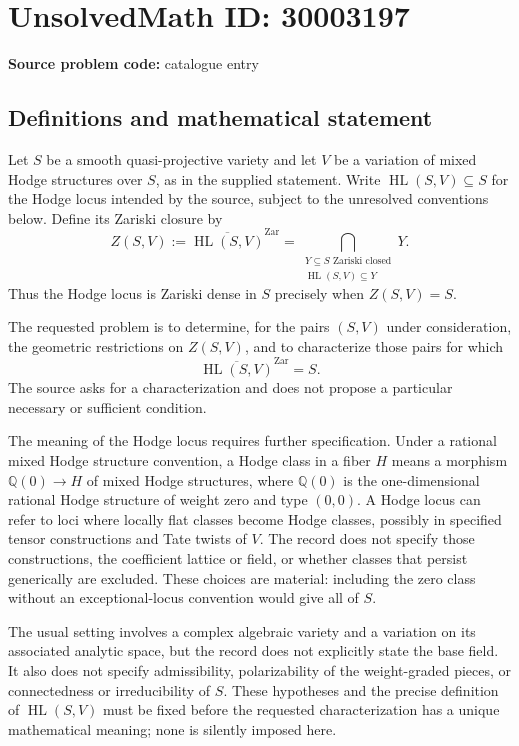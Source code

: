 \documentclass[11pt]{article}
\newcommand{\Q}{\mathbb{Q}}
\begin{document}
\section*{UnsolvedMath ID: 30003197}
\textbf{Source problem code:} catalogue entry
\subsection{Definitions and mathematical statement}
Let \(S\) be a smooth quasi-projective variety and let \(V\) be a variation of mixed Hodge structures over \(S\), as in the supplied statement. Write \(\operatorname{HL}(S,V)\subseteq S\) for the Hodge locus intended by the source, subject to the unresolved conventions below. Define its Zariski closure by
\[
Z(S,V):=\overline{\operatorname{HL}(S,V)}^{\mathrm{Zar}}
=\bigcap_{\substack{Y\subseteq S\text{ Zariski closed}\\ \operatorname{HL}(S,V)\subseteq Y}}Y.
\]
Thus the Hodge locus is Zariski dense in \(S\) precisely when \(Z(S,V)=S\).

The requested problem is to determine, for the pairs \((S,V)\) under consideration, the geometric restrictions on \(Z(S,V)\), and to characterize those pairs for which
\[
\overline{\operatorname{HL}(S,V)}^{\mathrm{Zar}}=S.
\]
The source asks for a characterization and does not propose a particular necessary or sufficient condition.

The meaning of the Hodge locus requires further specification. Under a rational mixed Hodge structure convention, a Hodge class in a fiber \(H\) means a morphism \(\Q(0)\to H\) of mixed Hodge structures, where \(\Q(0)\) is the one-dimensional rational Hodge structure of weight zero and type \((0,0)\). A Hodge locus can refer to loci where locally flat classes become Hodge classes, possibly in specified tensor constructions and Tate twists of \(V\). The record does not specify those constructions, the coefficient lattice or field, or whether classes that persist generically are excluded. These choices are material: including the zero class without an exceptional-locus convention would give all of \(S\).

The usual setting involves a complex algebraic variety and a variation on its associated analytic space, but the record does not explicitly state the base field. It also does not specify admissibility, polarizability of the weight-graded pieces, or connectedness or irreducibility of \(S\). These hypotheses and the precise definition of \(\operatorname{HL}(S,V)\) must be fixed before the requested characterization has a unique mathematical meaning; none is silently imposed here.
\end{document}
